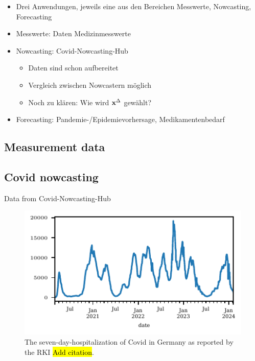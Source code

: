 \begin{itemize}
    \item Drei Anwendungen, jeweils eine aus den Bereichen Messwerte, Nowcasting, Forecasting
    \item Messwerte: Daten Medizinmesswerte
    \item Nowcasting: Covid-Nowcasting-Hub
    \begin{itemize}
        \item Daten sind schon aufbereitet
        \item Vergleich zwischen Nowcastern möglich
        \item Noch zu klären: Wie wird $\mathbf{x}^{\Delta}$ gewählt?
    \end{itemize}
    \item Forecasting: Pandemie-/Epidemievorhersage, Medikamentenbedarf
\end{itemize}

\subsection{Measurement data} \label{sec:application_measurement}

\subsection{Covid nowcasting} \label{sec:application-covid}

Data from Covid-Nowcasting-Hub


\begin{figure}
    \centering
    \includegraphics{plots/covid_nowcast/00_true_data.pdf}
    \caption{The seven-day-hospitalization of Covid in Germany as reported by the RKI \hl{Add citation}.}
    \label{fig:app-covid-true}
\end{figure}

